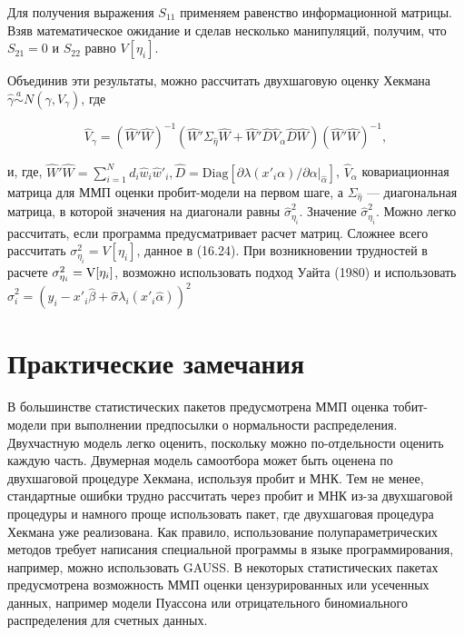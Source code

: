 Для получения выражения $S_{11}$ применяем равенство информационной матрицы. Взяв математическое ожидание и сделав несколько манипуляций, получим, что $S_{21}=0$ и $S_{22}$ равно $V[\eta_i]$.

Объединив эти результаты, можно рассчитать двухшаговую оценку Хекмана $\hat{\gamma} \overset{a}{\sim} N(\gamma,V_{\gamma})$, где

\begin{equation}
\hat{V}_{\gamma}=(\hat{W}'\hat{W})^{-1}(\hat{W}'\Sigma_{\hat{\eta}}\hat{W}+\hat{W}'\hat{D}\hat{V}_{\alpha}\hat{D}\hat{W})(\hat{W}'\hat{W})^{-1},
\end{equation}

и, где, $\hat{W}'\hat{W}=\sum^{N}_{i=1}d_{i}\hat{w}_{i}\hat{w}'_{i},\hat{D}=\mathrm{Diag}[\partial\lambda(x'_{i}\alpha)/\partial\alpha|_{\hat{\alpha}}]$, $\hat{V}_{\alpha}$ ковариационная матрица для ММП оценки пробит-модели на первом шаге, а $\Sigma_{\hat{\eta}}$ --- диагональная матрица, в которой значения на диагонали равны $\hat{\sigma}^{2}_{\eta_i}$. Значение $\hat{\sigma}^{2}_{\eta_i}$. Можно легко рассчитать, если программа предусматривает расчет матриц. Сложнее всего рассчитать $\sigma^{2}_{\eta_i}=V[\eta_i]$, данное в (16.24). При возникновении трудностей в расчете $\sigma^{2}_{\eta_i}=\mathrm{V}[\eta_i]$, возможно использовать подход Уайта (1980) и использовать $\hat{\sigma}^{2}_{i}=(y_{i}-x'_{i}\hat{\beta}+\hat{\sigma}\lambda_{i}(x'_{i}\hat{\alpha}))^2$

\section{Практические замечания}

В большинстве статистических пакетов предусмотрена ММП оценка тобит-модели при выполнении предпосылки о нормальности распределения. Двухчастную модель легко оценить, поскольку можно по-отдельности оценить каждую часть. Двумерная модель самоотбора может быть оценена по двухшаговой процедуре Хекмана, используя пробит и МНК. Тем не менее, стандартные ошибки трудно рассчитать через пробит и МНК из-за двухшаговой процедуры и намного проще использовать пакет, где двухшаговая процедура Хекмана уже реализована. Как правило, использование полупараметрических методов требует написания специальной программы в языке программирования, например, можно использовать GAUSS. В некоторых статистических пакетах предусмотрена возможность ММП оценки цензурированных или усеченных данных, например модели Пуассона или отрицательного биномиального распределения для счетных данных.

